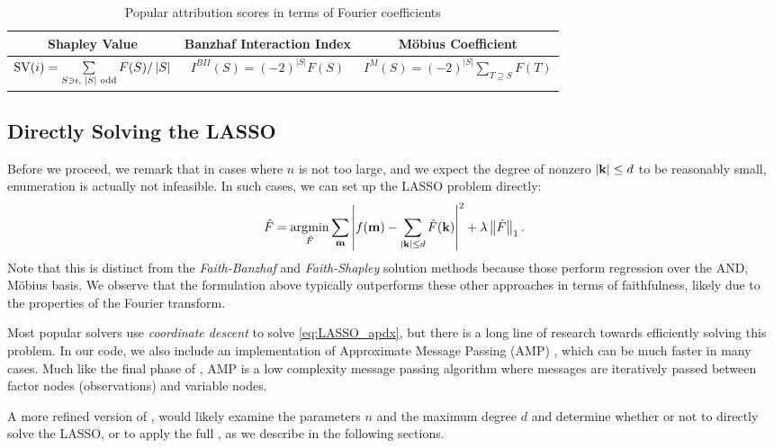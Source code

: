 \begin{table}[h]
\centering
\begin{tabular}{@{}ccc@{}}
\toprule
\textbf{Shapley Value} & \textbf{Banzhaf Interaction Index}         & \textbf{M\"obius Coefficient}  \\ \midrule
 $\mathrm{SV}(i) = \sum \limits_{S \ni i,\; \left\lvert S \right\rvert \text{ odd}}F(S)/\left\lvert S \right\rvert $& $I^{BII}(S) = (-2)^{|S|} F(S)$      &        $I^{M}(S) = (-2)^{|S|} \sum \limits_{T \supseteq S} F(T)$   \\ \bottomrule
\end{tabular}
\caption{Popular attribution scores in terms of Fourier coefficients}
\label{tab:fourier-def-1}
\end{table}

\subsection{Directly Solving the LASSO} 
Before we proceed, we remark that in cases where $n$ is not too large, and we expect the degree of nonzero $\left\lvert \mathbf k \right\rvert \leq d$ to be reasonably small, enumeration is actually not infeasible. In such cases, we can set up the LASSO problem directly:
\begin{equation}\label{eq:LASSO_apdx}
    \hat{F} = \operatorname*{\arg\!\min}_{\tilde{F}} \sum_{\mathbf m}\left\lvert f(\mathbf m) - \sum_{\left\lvert \mathbf k \right\rvert \leq d}  \tilde{F}(\mathbf k) \right\rvert^2 + \lambda \left\lVert\tilde{F}\right\rVert_1.
\end{equation}
Note that this is distinct from the \emph{Faith-Banzhaf} and \emph{Faith-Shapley} solution methods because those perform regression over the AND, M\"obius basis.
We observe that the formulation above typically outperforms these other approaches in terms of faithfulness, likely due to the properties of the Fourier transform. 

Most popular solvers use \emph{coordinate descent} to solve \eqref{eq:LASSO_apdx}, but there is a long line of research towards efficiently solving this problem. In our code, we also include an implementation of Approximate Message Passing (AMP) \cite{maleki2010approximate}, which can be much faster in many cases. Much like the final phase of \SpecExp{}, AMP is a low complexity message passing algorithm where messages are iteratively passed between factor nodes (observations) and variable nodes. 

A more refined version of \SpecExp{}, would likely examine the parameters $n$ and the maximum degree $d$ and determine whether or not to directly solve the LASSO, or to apply the full \SpecExp{}, as we describe in the following sections. 


